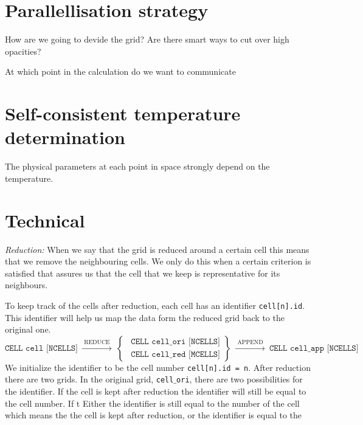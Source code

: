 \documentclass[]{article}
\begin{document}
\section{Parallellisation strategy}

How are we going to devide the grid? Are there smart ways to cut over high opacities?

\bigskip

At which point in the calculation do we want to communicate

\section{Self-consistent temperature determination}

The physical parameters at each point in space strongly depend on the temperature.








\section{Technical}

\emph{Reduction:} When we say that the grid is reduced around a certain cell this means that we remove the neighbouring cells. We only do this when a certain criterion is satisfied that assures us that the cell that we keep is representative for its neighbours.

\bigskip

To keep track of the cells after reduction, each cell has an identifier \texttt{cell[n].id}. This identifier will help us map the data form the reduced grid back to the original one.
\begin{equation*}
  \texttt{CELL cell [NCELLS]}
  \ \xrightarrow{\text{ REDUCE }} \ \left.
  \begin{cases}
    \ \ \texttt{CELL cell$\_$ori [NCELLS]} \\
    \ \ \texttt{CELL cell$\_$red [MCELLS]}
  \end{cases}
  \right\} \ \xrightarrow{\text{ APPEND }} \
  \texttt{CELL cell$\_$app [NCELLS]}
\end{equation*}
We initialize the identifier to be the cell number \texttt{cell[n].id = n}. After reduction there are two grids. In the original grid, \texttt{cell$\_$ori}, there are two possibilities for the identifier. If the cell is kept after reduction the identifier will still be equal to the cell number. If t Either the identifier is still equal to the number of the cell which means the the cell is kept after reduction, or the identifier is equal to the



\end{document}
